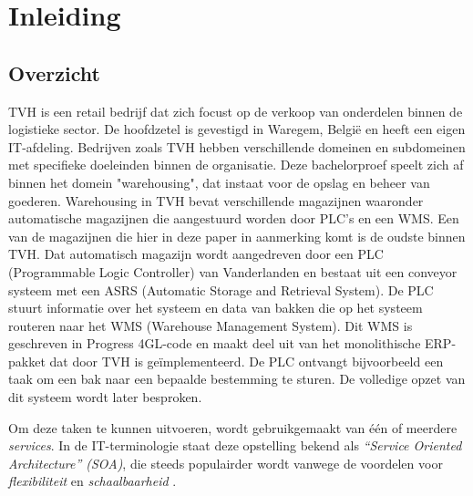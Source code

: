 



\section{Inleiding}%
\label{sec:inleiding}

\subsection{Overzicht}

TVH is een retail bedrijf dat zich focust op de verkoop van onderdelen binnen de logistieke sector. 
De hoofdzetel is gevestigd in Waregem, België en heeft een eigen IT-afdeling.
Bedrijven zoals TVH hebben verschillende domeinen en subdomeinen met specifieke doeleinden binnen de organisatie. 
Deze bachelorproef speelt zich af binnen het domein "warehousing", dat instaat voor de opslag en beheer van goederen. 
Warehousing in TVH bevat verschillende magazijnen waaronder automatische magazijnen die aangestuurd worden door PLC's en een WMS.
Een van de magazijnen die hier in deze paper in aanmerking komt is de oudste binnen TVH. 
Dat automatisch magazijn wordt aangedreven door een PLC (Programmable Logic Controller) 
van Vanderlanden en bestaat uit een conveyor systeem met een ASRS (Automatic Storage and Retrieval System).
De PLC stuurt informatie over het systeem en data van bakken die op het systeem routeren naar het WMS (Warehouse Management System). 
Dit WMS is geschreven in Progress 4GL-code en maakt deel uit van het monolithische ERP-pakket dat door TVH is geïmplementeerd. 
De PLC ontvangt bijvoorbeeld een taak om een bak naar een bepaalde bestemming te sturen. 
De volledige opzet van dit systeem wordt later besproken.

Om deze taken te kunnen uitvoeren, wordt gebruikgemaakt van één of meerdere \emph{services}. 
In de IT-terminologie staat deze opstelling bekend als \emph{“Service Oriented Architecture” (SOA)}, 
die steeds populairder wordt vanwege de voordelen voor \emph{flexibiliteit} en \emph{schaalbaarheid} \autocite{Bellemare2020}.

